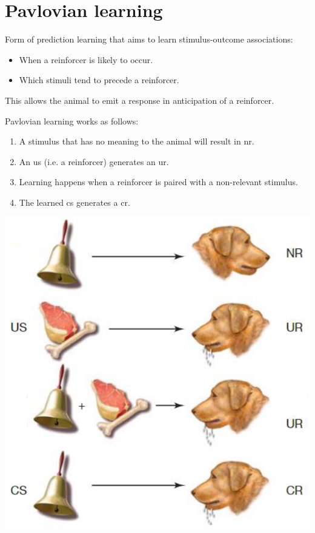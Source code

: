 \chapter{Pavlovian learning}


Form of prediction learning that aims to learn stimulus-outcome associations:
\begin{itemize}
    \item When a reinforcer is likely to occur.
    \item Which stimuli tend to precede a reinforcer.
\end{itemize}
This allows the animal to emit a response in anticipation of a reinforcer.

Pavlovian learning works as follows:\\
\begin{minipage}{0.58\linewidth}
    \begin{enumerate}[label=\alph*.]
        \item A stimulus that has no meaning to the animal will result in \ac{nr}.
        \item An \ac{us} (i.e. a reinforcer) generates an \ac{ur}.
        \item Learning happens when a reinforcer is paired with a non-relevant stimulus.
        \item The learned \ac{cs} generates a \ac{cr}.
    \end{enumerate}
\end{minipage}
\begin{minipage}{0.4\linewidth}
    \raggedleft
    \includegraphics[width=0.9\linewidth]{./img/pavlovian_example.png}
\end{minipage}\\

